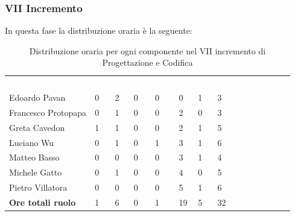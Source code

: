 \subsubsection{VII Incremento}
In questa fase la distribuzione oraria è la seguente:
\begin{table}[H]
\begin{center}
\renewcommand{\arraystretch}{1.25}
\begin{tabular}{ m{}<{\centering}  m{}<{\centering} m{}<{\centering} m{}<{\centering}  m{}<{\centering}  m{}<{\centering}  m{}<{\centering}  m{}<{\centering}   }
	\rowcolor{darkblue}
	\textcolor{white}{\textbf{Componente}} &\textcolor{white}{\textbf{Re}}&\textcolor{white}{\textbf{Pt}}&\textcolor{white}{\textbf{An}}&\textcolor{white}{\textbf{Am}}&\textcolor{white}{\textbf{Pr}}&\textcolor{white}{\textbf{Ve}}&\textcolor{white}{\textbf{Ore complessive}}\\ 
	Edoardo Pavan & 0 & 2 & 0 & 0 & 0 & 1 & 3 \\	
	
	Francesco Protopapa & 0 & 1 & 0 & 0 & 2 & 0 & 3 \\

	Greta Cavedon & 1 & 1 & 0 & 0 & 2 & 1 & 5 \\
	
	Luciano Wu & 0 & 1 & 0 & 1 & 3 & 1 & 6 \\
	
	Matteo Basso & 0 & 0 & 0 & 0 & 3 & 1 & 4 \\
	
	Michele Gatto & 0 & 1 & 0 & 0 & 4 & 0 & 5 \\
	
	Pietro Villatora & 0 & 0 & 0 & 0 & 5 & 1 & 6 \\
	
	\textbf{Ore totali ruolo} & 1 & 6 & 0 & 1 & 19 & 5 & 32 \\

\end{tabular}
\caption{Distribuzione oraria per ogni componente nel VII incremento di Progettazione e Codifica}
\end{center}
\end{table}

